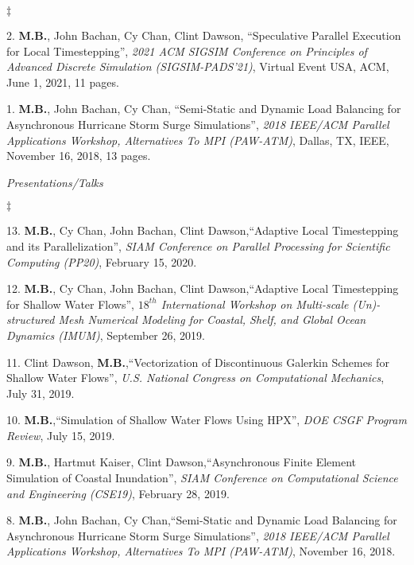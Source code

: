 \documentclass[margin,line]{res}
\newenvironment{list2}{
  \begin{list}{$\ddagger$}{%
      \setlength{\itemsep}{0in}
      \setlength{\parsep}{0in} \setlength{\parskip}{0in}
      \setlength{\topsep}{0in} \setlength{\partopsep}{0in}
      \setlength{\leftmargin}{0.2in}}}{\end{list}}
\newcommand{\inproceeding}[7]{%
#1, ``#2'', {\it #3}, #4, #5, #6, #7 pages.%
}
\newcommand{\talk}[4]{%
#1,``#2'', {\it #3}, #4.%
}
\begin{document}
\begin{resume}
\begin{list2}
\item[2.] \inproceeding{{\bf M.B.}, John Bachan, Cy Chan, Clint Dawson}{Speculative Parallel Execution for Local Timestepping}{2021 ACM SIGSIM Conference on Principles of Advanced Discrete Simulation (SIGSIM-PADS'21)}{Virtual Event USA}{ACM}{June 1, 2021}{11}
\item[1.] \inproceeding{{\bf M.B.}, John Bachan, Cy Chan}{Semi-Static and Dynamic Load Balancing for Asynchronous Hurricane Storm Surge Simulations}{2018 IEEE/ACM Parallel Applications Workshop, Alternatives To MPI (PAW-ATM)}{Dallas, TX}{IEEE}{November 16, 2018}{13}
\end{list2}


\textit{Presentations/Talks}
\vspace{0.05in}
\begin{list2}

\item[13.] \talk{{\bf M.B.}, Cy Chan, John Bachan, Clint Dawson}{Adaptive Local Timestepping and its Parallelization}{SIAM Conference on Parallel Processing for Scientific Computing (PP20)}{February 15, 2020}

\item[12.] \talk{{\bf M.B.}, Cy Chan, John Bachan, Clint Dawson}{Adaptive Local Timestepping for Shallow Water Flows}{$18^{th}$ International Workshop on Multi-scale (Un)-structured Mesh Numerical Modeling for Coastal, Shelf, and Global Ocean Dynamics (IMUM)}{September 26, 2019}

\item[11.] \talk{Clint Dawson, {\bf M.B.}}{Vectorization of Discontinuous Galerkin Schemes for Shallow Water Flows}{U.S. National Congress on Computational Mechanics}{July 31, 2019}

\item[10.] \talk{{\bf M.B.}}{Simulation of Shallow Water Flows Using HPX}{DOE CSGF Program Review}{July 15, 2019}

\item[9.] \talk{{\bf M.B.}, Hartmut Kaiser, Clint Dawson}{Asynchronous Finite Element Simulation of Coastal Inundation}{SIAM Conference on Computational Science and Engineering (CSE19)}{February 28, 2019}

\item[8.] \talk{{\bf M.B.}, John Bachan, Cy Chan}{Semi-Static and Dynamic Load Balancing for Asynchronous Hurricane Storm Surge Simulations}{2018 IEEE/ACM Parallel Applications Workshop, Alternatives To MPI (PAW-ATM)}{November 16, 2018}


\end{list2}
\end{resume}
\end{document}
